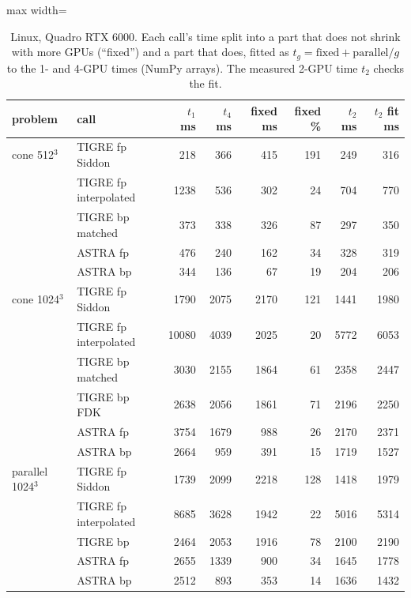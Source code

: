\begin{table}[H]
\centering
\caption{Linux, Quadro RTX 6000. Each call's time split into a part that does not shrink with more GPUs (``fixed'') and a part that does, fitted as $t_g = \text{fixed} + \text{parallel}/g$ to the 1- and 4-GPU times (NumPy arrays). The measured 2-GPU time $t_2$ checks the fit.}
\label{tab:lin-fixed}
\small\setlength{\tabcolsep}{4pt}
\begin{adjustbox}{max width=\linewidth}
\begin{tabular}{llrrrrrr}
\toprule
problem & call & $t_1$ ms & $t_4$ ms & fixed ms & fixed \% & $t_2$ ms & $t_2$ fit ms\\
\midrule
cone 512$^3$ & TIGRE fp Siddon & 218 & 366 & 415 & 191 & 249 & 316\\
 & TIGRE fp interpolated & 1238 & 536 & 302 & 24 & 704 & 770\\
 & TIGRE bp matched & 373 & 338 & 326 & 87 & 297 & 350\\
 & ASTRA fp & 476 & 240 & 162 & 34 & 328 & 319\\
 & ASTRA bp & 344 & 136 & 67 & 19 & 204 & 206\\
\addlinespace
cone 1024$^3$ & TIGRE fp Siddon & 1790 & 2075 & 2170 & 121 & 1441 & 1980\\
 & TIGRE fp interpolated & 10080 & 4039 & 2025 & 20 & 5772 & 6053\\
 & TIGRE bp matched & 3030 & 2155 & 1864 & 61 & 2358 & 2447\\
 & TIGRE bp FDK & 2638 & 2056 & 1861 & 71 & 2196 & 2250\\
 & ASTRA fp & 3754 & 1679 & 988 & 26 & 2170 & 2371\\
 & ASTRA bp & 2664 & 959 & 391 & 15 & 1719 & 1527\\
\addlinespace
parallel 1024$^3$ & TIGRE fp Siddon & 1739 & 2099 & 2218 & 128 & 1418 & 1979\\
 & TIGRE fp interpolated & 8685 & 3628 & 1942 & 22 & 5016 & 5314\\
 & TIGRE bp & 2464 & 2053 & 1916 & 78 & 2100 & 2190\\
 & ASTRA fp & 2655 & 1339 & 900 & 34 & 1645 & 1778\\
 & ASTRA bp & 2512 & 893 & 353 & 14 & 1636 & 1432\\
\bottomrule
\end{tabular}
\end{adjustbox}
\end{table}
